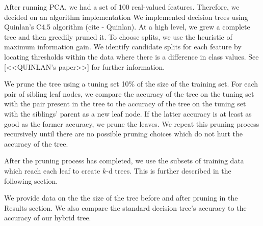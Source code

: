 After running PCA, we had a set of 100 real-valued features. 
Therefore, we decided on an algorithm implementation
We implemented decision trees using Quinlan's C4.5 algorithm (cite - Quinlan).
At a high level, we grew a complete tree and then greedily pruned it.
To choose splits, we use the heuristic of maximum information gain.  We identify candidate splits for each feature by locating thresholds within the data where there is a difference in class values.  See [<<QUINLAN's paper>>] for further information.

We prune the tree using a tuning set 10\% of the size of the training set.
For each pair of sibling leaf nodes, we compare the accuracy of the tree on the tuning set with the pair present in the tree to the accuracy of the tree on the tuning set with the siblings' parent as a new leaf node.
If the latter accuracy is at least as good as the former accuracy, we prune the leaves.  We repeat this pruning process recursively until there are no possible pruning choices which do not hurt the accuracy of the tree.

After the pruning process has completed, we use the subsets of training data which reach each leaf to create $k$-d trees.  This is further described in the following section.

We provide data on the the size of the tree before and after pruning in the Results section.  We also compare the standard decision tree's accuracy to the accuracy of our hybrid tree.


